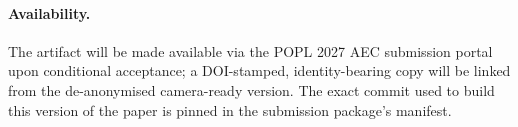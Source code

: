 \documentclass[acmsmall,screen,review,anonymous,nonacm]{acmart}
\begin{document}
\paragraph{Availability.}
The artifact will be made available via the POPL 2027 AEC submission portal upon conditional acceptance; a DOI-stamped, identity-bearing copy will be linked from the de-anonymised camera-ready version. The exact commit used to build this version of the paper is pinned in the submission package's manifest.



\end{document}
